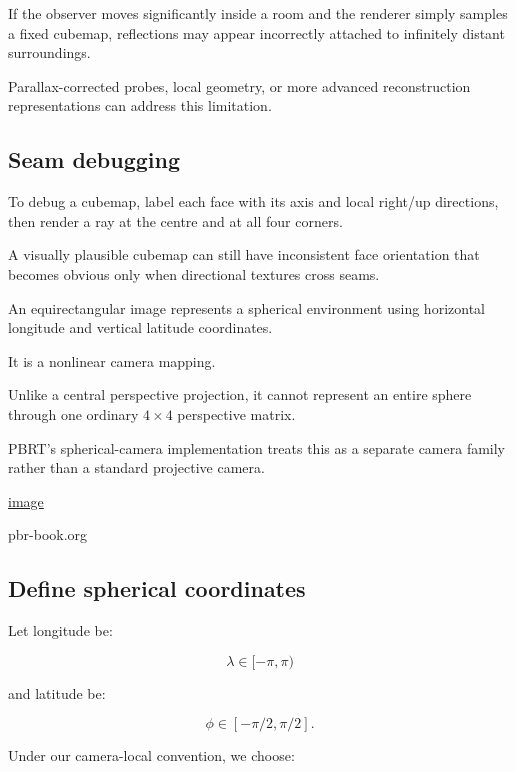 If the observer moves significantly inside a room and the renderer simply samples a fixed cubemap, reflections may appear incorrectly attached to infinitely distant surroundings.

Parallax-corrected probes, local geometry, or more advanced reconstruction representations can address this limitation.

\subsection{Seam debugging}\label{02-foundations-ii-ch035-seam-debugging}

\hypertarget{02-foundations-ii-ch035-seam-debugging}{}

To debug a cubemap, label each face with its axis and local right/up directions, then render a ray at the centre and at all four corners.

A visually plausible cubemap can still have inconsistent face orientation that becomes obvious only when directional textures cross seams.

An equirectangular image represents a spherical environment using horizontal longitude and vertical latitude coordinates.

It is a nonlinear camera mapping.

Unlike a central perspective projection, it cannot represent an entire sphere through one ordinary \(4\times4\) perspective matrix.

PBRT's spherical-camera implementation treats this as a separate camera family rather than a standard projective camera. 

\href{https://www.google.com/s2/favicons?domain=https://pbr-book.org&sz=32}{image}

pbr-book.org

\subsection{Define spherical coordinates}\label{02-foundations-ii-ch035-define-spherical-coordinates}

\hypertarget{02-foundations-ii-ch035-define-spherical-coordinates}{}

Let longitude be:

\[ \lambda\in[-\pi,\pi) \]

and latitude be:

\[ \phi\in[-\pi/2,\pi/2]. \]

Under our camera-local convention, we choose:

